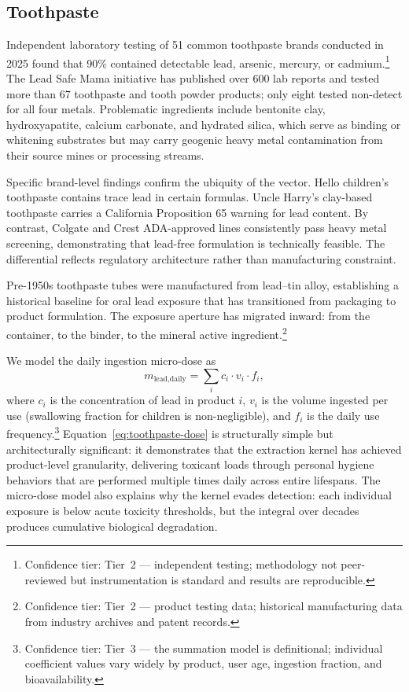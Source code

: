 \subsection{Toothpaste}

Independent laboratory testing of 51 common toothpaste brands conducted in 2025
found that 90\% contained detectable lead, arsenic, mercury, or
cadmium.\footnote{Confidence tier: Tier~2 --- independent
testing; methodology not peer-reviewed but instrumentation is standard and
results are reproducible.} The Lead Safe Mama initiative has published over 600
lab reports and tested more than 67 toothpaste and tooth powder products; only
eight tested non-detect for all four metals. Problematic ingredients include
bentonite clay, hydroxyapatite, calcium carbonate, and hydrated silica, which
serve as binding or whitening substrates but may carry geogenic heavy metal
contamination from their source mines or processing streams.

Specific brand-level findings confirm the ubiquity of the vector. Hello
children's toothpaste contains trace lead in certain formulas. Uncle Harry's
clay-based toothpaste carries a California Proposition 65 warning for lead
content. By contrast, Colgate and Crest ADA-approved lines consistently pass
heavy metal screening, demonstrating that lead-free formulation is technically
feasible. The differential reflects regulatory architecture rather than
manufacturing constraint.

Pre-1950s toothpaste tubes were manufactured from lead--tin alloy, establishing a
historical baseline for oral lead exposure that has transitioned from packaging
to product formulation. The exposure aperture has migrated inward: from the
container, to the binder, to the mineral active ingredient.\footnote{Confidence
tier: Tier~2 --- product testing data; historical manufacturing data from
industry archives and patent records.}

We model the daily ingestion micro-dose as
\begin{equation}
m_{\text{lead,daily}} = \sum_{i} c_{i} \cdot v_{i} \cdot f_{i},
\label{eq:toothpaste-dose}
\end{equation}
where $c_{i}$ is the concentration of lead in product $i$, $v_{i}$ is the volume
ingested per use (swallowing fraction for children is non-negligible), and
$f_{i}$ is the daily use frequency.\footnote{Confidence tier: Tier~3 --- the
summation model is definitional; individual coefficient values vary widely by
product, user age, ingestion fraction, and bioavailability.}
Equation~\eqref{eq:toothpaste-dose} is structurally simple but architecturally
significant: it demonstrates that the extraction kernel has achieved
product-level granularity, delivering toxicant loads through personal hygiene
behaviors that are performed multiple times daily across entire lifespans. The
micro-dose model also explains why the kernel evades detection: each individual
exposure is below acute toxicity thresholds, but the integral over decades
produces cumulative biological degradation.

